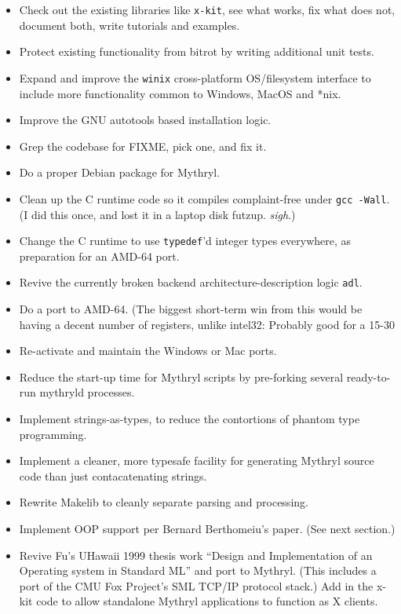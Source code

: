 \begin{itemize}
\item Check out the existing libraries like {\tt x-kit}, see what works, fix what does not, document both, write tutorials and examples.
\item Protect existing functionality from bitrot by writing additional unit tests.
\item Expand and improve the {\tt winix} cross-platform OS/filesystem interface to include more functionality common to Windows, MacOS and *nix.
\item Improve the {\sc GNU} autotools based installation logic.
\item Grep the codebase for {\sc FIXME}, pick one, and fix it.
\item Do a proper Debian package for Mythryl.
\item Clean up the C runtime code so it compiles complaint-free under {\tt gcc -Wall}.  (I did this once, and lost it in a laptop disk futzup. {\em sigh}.)
\item Change the C runtime to use {\tt typedef}'d integer types everywhere, as preparation for an AMD-64 port.
\item Revive the currently broken backend architecture-description logic {\tt adl}.
\item Do a port to AMD-64.  (The biggest short-term win from this would be having a decent number of registers, unlike intel32: Probably good for a 15-30%
\item Re-activate and maintain the Windows or Mac ports.
\item Reduce the start-up time for Mythryl scripts by pre-forking several ready-to-run mythryld processes.
\item Implement strings-as-types, to reduce the contortions of phantom type programming.
\item Implement a cleaner, more typesafe facility for generating Mythryl source code than just contacatenating strings.
\item Rewrite Makelib to cleanly separate parsing and processing.
\item Implement {\sc OOP} support per Bernard Berthomeiu's paper. (See next section.)
\item Revive Fu's UHawaii 1999 thesis work ``Design and Implementation of an Operating system in Standard ML'' and port to Mythryl. 
(This includes a port of the CMU Fox Project's SML TCP/IP protocol stack.)  Add in the x-kit code to allow standalone Mythryl 
applications to function as X clients.

\end{itemize}
